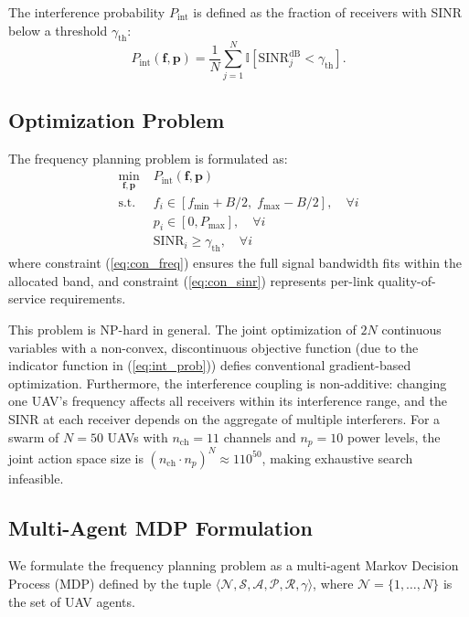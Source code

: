 \documentclass[conference]{IEEEtran}
\begin{document}
The interference probability $P_{\text{int}}$ is defined as the fraction of receivers with SINR below a threshold $\gamma_{\text{th}}$:
\begin{equation}
P_{\text{int}}(\mathbf{f}, \mathbf{p}) = \frac{1}{N} \sum_{j=1}^{N} \mathbb{I}\left[\text{SINR}_j^{\text{dB}} < \gamma_{\text{th}}\right].
\label{eq:int_prob}
\end{equation}

\subsection{Optimization Problem}

The frequency planning problem is formulated as:
\begin{align}
\min_{\mathbf{f}, \mathbf{p}} \; & P_{\text{int}}(\mathbf{f}, \mathbf{p}) \label{eq:obj} \\
\text{s.t.} \; & f_i \in [f_{\min} + B/2,\; f_{\max} - B/2], \quad \forall i \label{eq:con_freq} \\
& p_i \in [0, P_{\max}], \quad \forall i \label{eq:con_power} \\
& \text{SINR}_i \geq \gamma_{\text{th}}, \quad \forall i \label{eq:con_sinr}
\end{align}
where constraint (\ref{eq:con_freq}) ensures the full signal bandwidth fits within the allocated band, and constraint (\ref{eq:con_sinr}) represents per-link quality-of-service requirements.

This problem is NP-hard in general. The joint optimization of $2N$ continuous variables with a non-convex, discontinuous objective function (due to the indicator function in (\ref{eq:int_prob})) defies conventional gradient-based optimization. Furthermore, the interference coupling is non-additive: changing one UAV's frequency affects all receivers within its interference range, and the SINR at each receiver depends on the aggregate of multiple interferers. For a swarm of $N = 50$ UAVs with $n_{\text{ch}} = 11$ channels and $n_p = 10$ power levels, the joint action space size is $(n_{\text{ch}} \cdot n_p)^N \approx 110^{50}$, making exhaustive search infeasible.

\subsection{Multi-Agent MDP Formulation}

We formulate the frequency planning problem as a multi-agent Markov Decision Process (MDP) defined by the tuple $\langle \mathcal{N}, \mathcal{S}, \mathcal{A}, \mathcal{P}, \mathcal{R}, \gamma \rangle$, where $\mathcal{N} = \{1, \ldots, N\}$ is the set of UAV agents.
\end{document}
